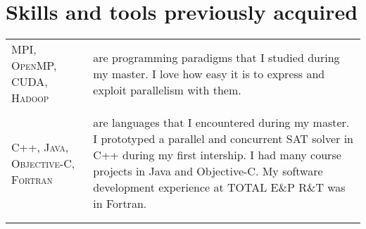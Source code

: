 \section{Skills and tools previously acquired}

\begin{tabular}{p{2cm}|p{11cm}}

\textsc{MPI, OpenMP, CUDA, Hadoop} & are programming paradigms that I studied during my master. I love how easy it is to express and exploit parallelism with them.\\
\multicolumn{2}{c}{} \\

\textsc{C++, \newline Java, Objective-C, Fortran} & are languages that I encountered during my master.
I prototyped a parallel and concurrent SAT solver in C++ during my first intership.
I had many course projects in Java and Objective-C.
My software development experience at \textsc{TOTAL E\&P R\&T} was in Fortran.\\
\multicolumn{2}{c}{} \\

\multicolumn{2}{c}{} \\

\end{tabular}
